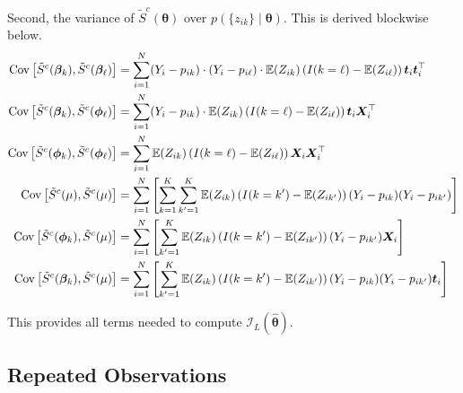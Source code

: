 Second, the variance of $\tilde{S}^c(\bm{\theta})$ over $p(\{z_{ik}\} \mid \bm{\theta})$. This is derived blockwise below.
\begin{subequations}
	\begin{align*}
	\mathrm{Cov}\left[\tilde{S}^c(\bm{\beta}_k), \tilde{S}^c(\bm{\beta}_{\ell})\right] &= \sum_{i=1}^N (Y_i - p_{ik}) \cdot (Y_i - p_{i\ell}) \cdot \mathbb{E}(Z_{ik}) \left(I(k =\ell) - \mathbb{E}(Z_{i\ell})\right) \bm{t}_i\bm{t}_i^\top \\
	\mathrm{Cov}\left[\tilde{S}^c(\bm{\beta}_k), \tilde{S}^c(\bm{\phi}_{\ell})\right] &= \sum_{i=1}^N (Y_i - p_{ik}) \cdot \mathbb{E}(Z_{ik}) \left(I(k =\ell) - \mathbb{E}(Z_{i\ell})\right) \bm{t}_i \bm{X}_i^\top \\
	\mathrm{Cov}\left[\tilde{S}^c(\bm{\phi}_k), \tilde{S}^c(\bm{\phi}_{\ell})\right] &= \sum_{i=1}^N \mathbb{E}(Z_{ik}) \left(I(k =\ell) - \mathbb{E}(Z_{i\ell})\right) \bm{X}_i\bm{X}_i^\top \\
	\mathrm{Cov}\left[\tilde{S}^c(\mu), \tilde{S}^c(\mu)\right] &= \sum_{i=1}^N \left[\sum_{k=1}^K \sum_{k'=1}^K \mathbb{E}(Z_{ik}) \left(I(k=k') - \mathbb{E}(Z_{ik'})\right)(Y_{i} - p_{ik}) (Y_i - p_{ik'})\right] \\
	\mathrm{Cov}\left[\tilde{S}^c(\bm{\phi}_k), \tilde{S}^c(\mu)\right] &= \sum_{i=1}^N \left[\sum_{k'=1}^K \mathbb{E}(Z_{ik}) \left(I(k=k') - \mathbb{E}(Z_{ik'})\right) (Y_i - p_{ik'}) \bm{X}_i\right] \\
	\mathrm{Cov}\left[\tilde{S}^c(\bm{\beta}_k), \tilde{S}^c(\mu)\right] &= \sum_{i=1}^N \left[\sum_{k'=1}^K \mathbb{E}(Z_{ik}) \left(I(k=k') - \mathbb{E}(Z_{ik'})\right)(Y_{i} - p_{ik}) (Y_i - p_{ik'}) \bm{t}_i\right] 
	\end{align*}
\end{subequations}

This provides all terms needed to compute $\mathcal{I}_L(\hat{\bm{\theta}})$.

\subsection{Repeated Observations}\label{append:hes_rep_obs}

